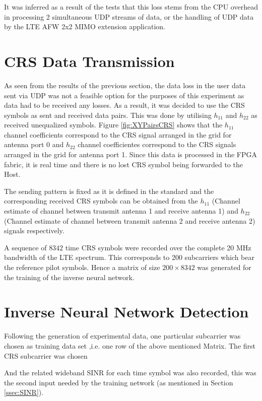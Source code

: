 It was inferred as a result of the tests that this loss stems from the CPU overhead in processing 2 simultaneous UDP streams of data, or the handling of UDP data by the LTE AFW 2x2 MIMO extension application.

\section{CRS Data Transmission}\label{sec:CRSDataVisualisation}
As seen from the results of the previous section, the data loss in the user data sent via UDP was not a feasible option for the purposes of this experiment as data had to be received any losses. As a result, it was decided to use the CRS symbols as sent and received data pairs. This was done by utilising $h_{11}$ and $h_{22}$ as received unequalized symbols. Figure \ref{fig:XYPairsCRS} shows that the $h_{11}$ channel coefficients correspond to the 
CRS signal arranged in the grid for antenna port 0 and $h_{22}$ channel coefficientes correspond to the CRS signals arranged in the grid for antenna port 1. Since this data is processed in the FPGA fabric, it is real time and there is no lost CRS symbol being forwarded to the Host.

The sending pattern is fixed as it is defined in the standard and the corresponding received CRS symbols can be obtained from the $h_{11}$ (Channel estimate of channel between transmit antenna 1 and receive antenna 1) and $h_{22}$ (Channel estimate of channel between transmit antenna 2 and receive antenna 2) signals respectively.

A sequence of $8342$ time CRS symbols were recorded over the complete 20 \si{\mega\hertz} bandwidth of the LTE spectrum. This corresponds to 200 subcarriers which bear the reference pilot symbols. Hence a matrix of size $200\times8342$ was generated for the training of the inverse neural network.

\section{Inverse Neural Network Detection}\label{sec:INNDet}

Following the generation of experimental data, one particular subcarrier was chosen as training data set ,i.e. one row of the above mentioned Matrix. The first CRS subcarrier was chosen

And the related wideband SINR for each time symbol was also recorded, this was the second input needed by the training network (as mentioned in Section \ref{ssec:SINR}).

